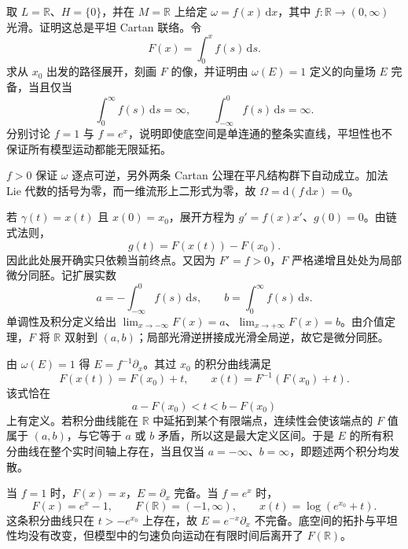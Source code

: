 \begin{exercise}\label{g1:ex:cartan-one-dimensional-completeness}
	取 \(L=\mathbb R\)、\(H=\{0\}\)，并在 \(M=\mathbb R\) 上给定 \(\omega=f(x)\,\mathrm{d}x\)，其中 \(f:\mathbb R\to(0,\infty)\) 光滑。证明这总是平坦 Cartan 联络。令
	\[
		F(x)=\int_0^x f(s)\,\mathrm{d}s.
	\]
	求从 \(x_0\) 出发的路径展开，刻画 \(F\) 的像，并证明由 \(\omega(E)=1\) 定义的向量场 \(E\) 完备，当且仅当
	\[
		\int_0^\infty f(s)\,\mathrm{d}s=\infty,
		\qquad
		\int_{-\infty}^0 f(s)\,\mathrm{d}s=\infty.
	\]
	分别讨论 \(f=1\) 与 \(f=e^x\)，说明即使底空间是单连通的整条实直线，平坦性也不保证所有模型运动都能无限延拓。
\end{exercise}
\begin{solution}
	\(f>0\) 保证 \(\omega\) 逐点可逆，另外两条 Cartan 公理在平凡结构群下自动成立。加法Lie 代数的括号为零，而一维流形上二形式为零，故 \(\Omega=\mathrm{d}(f\,\mathrm{d}x)=0\)。

	若 \(\gamma(t)=x(t)\) 且 \(x(0)=x_0\)，展开方程为 \(g'=f(x)x'\)、\(g(0)=0\)。由链式法则，
	\[
		g(t)=F(x(t))-F(x_0).
	\]
	因此此处展开确实只依赖当前终点。又因为 \(F'=f>0\)，\(F\) 严格递增且处处为局部微分同胚。记扩展实数
	\[
		a=-\int_{-\infty}^0 f(s)\,\mathrm{d}s,\qquad
		b=\int_0^\infty f(s)\,\mathrm{d}s.
	\]
	单调性及积分定义给出 \(\lim_{x\to-\infty}F(x)=a\)、\(\lim_{x\to+\infty}F(x)=b\)。由介值定理，\(F\) 将 \(\mathbb R\) 双射到 \((a,b)\)；局部光滑逆拼接成光滑全局逆，故它是微分同胚。

	由 \(\omega(E)=1\) 得 \(E=f^{-1}\partial_x\)。其过 \(x_0\) 的积分曲线满足
	\[
		F(x(t))=F(x_0)+t,\qquad
		x(t)=F^{-1}(F(x_0)+t).
	\]
	该式恰在
	\[
		a-F(x_0)<t<b-F(x_0)
	\]
	上有定义。若积分曲线能在 \(\mathbb R\) 中延拓到某个有限端点，连续性会使该端点的 \(F\) 值属于 \((a,b)\)，与它等于 \(a\) 或 \(b\) 矛盾，所以这是最大定义区间。于是 \(E\) 的所有积分曲线在整个实时间轴上存在，当且仅当 \(a=-\infty\)、\(b=\infty\)，即题述两个积分均发散。

	当 \(f=1\) 时，\(F(x)=x\)，\(E=\partial_x\) 完备。当 \(f=e^x\) 时，
	\[
		F(x)=e^x-1,\qquad
		F(\mathbb R)=(-1,\infty),\qquad
		x(t)=\log(e^{x_0}+t).
	\]
	这条积分曲线只在 \(t>-e^{x_0}\) 上存在，故 \(E=e^{-x}\partial_x\) 不完备。底空间的拓扑与平坦性均没有改变，但模型中的匀速负向运动在有限时间后离开了 \(F(\mathbb R)\)。
\end{solution}

